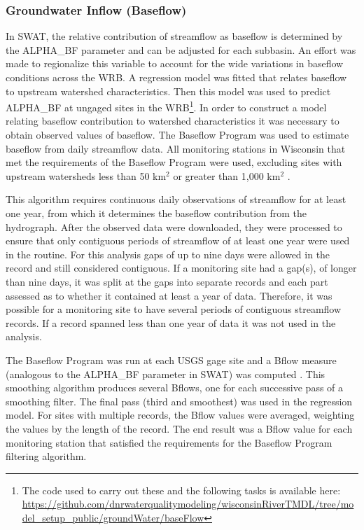 \subsubsection{Groundwater Inflow (Baseflow)}\label{sec:baseflow}
	In SWAT, the relative contribution of streamflow as baseflow is determined by the ALPHA\_BF parameter and can be adjusted for each subbasin. An effort was made to regionalize this variable to account for the wide variations in baseflow conditions across the WRB. A regression model was fitted that relates baseflow to upstream watershed characteristics. Then this model was used to predict ALPHA\_BF at ungaged sites in the WRB\footnote{The code used to carry out these and the following tasks is available here: \url{https://github.com/dnrwaterqualitymodeling/wisconsinRiverTMDL/tree/model_setup_public/groundWater/baseFlow}}.
	In order to construct a model relating baseflow contribution to watershed characteristics it was necessary to obtain observed values of baseflow. The Baseflow Program \citep{arnold_automated_1995} was used to estimate baseflow from daily streamflow data. All monitoring stations in Wisconsin  that met the requirements of the Baseflow Program were used, excluding sites with upstream watersheds less than 50 km$^2$ or greater than 1,000 km$^2$ \citep{arnold_regional_2000}.

	This algorithm requires continuous daily observations of streamflow for at least one year, from which it determines the baseflow contribution from the hydrograph.	After the observed data were downloaded, they were processed to ensure that only contiguous periods of streamflow of at least one year were used in the routine. For this analysis gaps of up to nine days were allowed in the record and still considered contiguous. If a monitoring site had a gap(s), of longer than nine days, it was split at the gaps into separate records and each part assessed as to whether it contained at least a year of data. Therefore, it was possible for a monitoring site to have several periods of contiguous streamflow records. If a record spanned less than one year of data it was not used in the analysis.
	
	The Baseflow Program was run at each USGS gage site and a Bflow measure (analogous to the ALPHA\_BF parameter in SWAT) was computed \citep{arnold_automated_1995}. 
	This smoothing algorithm produces several Bflows, one for each successive pass of a smoothing filter. 
	The final pass (third and smoothest) was used in the regression model.
	For sites with multiple records, the Bflow values were averaged, weighting the values by the length of the record.
	The end result was a Bflow value for each monitoring station that satisfied the requirements for the Baseflow Program filtering algorithm. 

